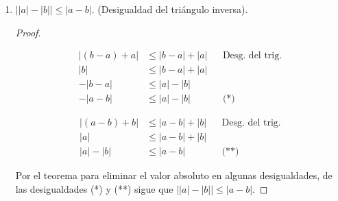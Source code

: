 \documentclass[11pt]{article}
\begin{document}
\begin{enumerate}[label=\alph*)]
    \vspace{-1em}\begin{proof} 
        Por casos.
        \begin{enumerate}[label=\roman*)]
            \item Si $0 \leq a+b$, por definición, $|a+b|=a+b$. Como, $a \leq |a|$ y $b \leq |b|$, entonces, $a+b \leq |a|+|b|$. Por tanto, $|a+b| \leq |a|+|b|$.
            \item Si $a+b<0$, por definición, $|a+b|=-\bigl(a+b\bigr)=-a-b$. Como, $-a \leq |a|$ y $-b \leq |b|$, entonces, $-a-b \leq |a|+|b|$. Por tanto, $|a+b| \leq |a|+|b|$. \qedhere
        \end{enumerate}    
    \end{proof} \vspace{-1em}
%

    \item $\big| |a|-|b| \big| \leq |a-b|$. (Desigualdad del triángulo inversa).

    \begin{proof} \leavevmode
    \begin{center}\vspace{-2.5em}
    \begin{minipage}[t]{.5\linewidth}
    \begin{align*}
        |(b-a)+a| &\leq |b-a|+|a| && \text{Desg. del trig.} \\
        |b| &\leq |b-a|+|a| \\
        -|b-a| &\leq |a|-|b| \\
        -|a-b| &\leq |a|-|b| && \text{(*)}
    \end{align*}
    \end{minipage}%
    \begin{minipage}[t]{.5\linewidth}
    \begin{align*}
        |(a-b)+b| &\leq |a-b|+|b| && \text{Desg. del trig.} \\
        |a| &\leq |a-b|+|b| \\
        |a|-|b| &\leq |a-b| && \text{(**)}
    \end{align*}
    \end{minipage}
    \end{center}
    Por el teorema para eliminar el valor absoluto en algunas desigualdades, de las desigualdades (*) y (**) sigue que $\big| |a| - |b| \big| \leq |a-b|$.
    \end{proof} \vspace{-1em}


\end{enumerate}
\end{document}
